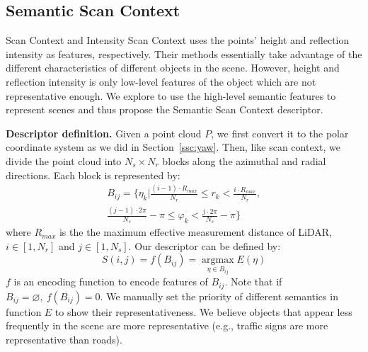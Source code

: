 \documentclass[letterpaper, 10 pt, conference]{ieeeconf}  %
\begin{document}
\subsection{Semantic Scan Context}
Scan Context and Intensity Scan Context uses the points' height and reflection intensity as features, respectively. Their methods essentially take advantage of the different characteristics of different objects in the scene. However, height and reflection intensity is only low-level features of the object which are not representative enough. We explore to use the high-level semantic features to represent scenes and thus propose the Semantic Scan Context descriptor.

\smallskip\noindent\textbf{Descriptor definition.} Given a point cloud \(P\), we first convert it to the polar coordinate system as we did in Section~\ref{ssc:yaw}. Then, like scan context, we divide the point cloud into \(N_s\times N_r\) blocks along the azimuthal and radial directions. Each block is represented by:
\begin{equation}
    \begin{aligned}
        B_{ij}=\{\eta_k|\frac{(i-1)\cdot R_{max}}{N_r}\leq r_k< \frac{i\cdot R_{max}}{N_r},\\
        \frac{(j-1)\cdot 2\pi }{N_s}-\pi \leq \varphi_k<\frac{j\cdot 2\pi }{N_s}-\pi\}
    \end{aligned}
\end{equation}
where \(R_{max}\) is the the maximum effective measurement distance of LiDAR, \(i\in [1,N_r]\) and \(j\in [1,N_s]\). Our descriptor can be defined by:
\begin{equation}
    S(i,j)=f(B_{ij})=\mathop{argmax}\limits_{\eta \in B_{ij}} E(\eta )\label{eq:descriptor}
\end{equation}
\(f\) is an encoding function to encode features of \(B_{ij}\). Note that if \(B_{ij}=\varnothing ,~f(B_{ij})=0\). We manually set the priority of different semantics in function \(E \) to show their representativeness. We believe objects that appear less frequently in the scene are more representative (e.g., traffic signs are more representative than roads). 
\end{document}
